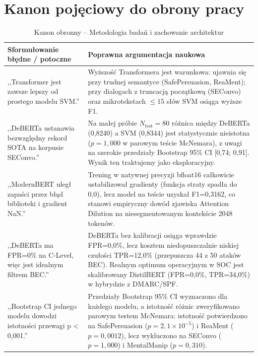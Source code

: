 \documentclass[12pt,a4paper,twoside]{report}
\begin{document}
\chapter{Kanon pojęciowy do obrony pracy}\label{app:banned}
\begin{table}[H]\centering
\caption{Kanon obronny -- Metodologia badań i zachowanie architektur}\label{tab:banned_arch}
\footnotesize
\begin{tabularx}{\textwidth}{X X}\toprule
\textbf{Sformułowanie błędne / potoczne} & \textbf{Poprawna argumentacja naukowa} \\\midrule
,,Transformer jest zawsze lepszy od prostego modelu SVM.'' &
  Wyższość Transformera jest warunkowa: ujawnia się przy trudnej semantyce (SafePersuasion, ReaMent); przy dialogach z truncacją początkową (SEConvo) oraz mikrotekstach $\le 15$ słów SVM osiąga wyższe F1. \\\midrule
,,DeBERTa ustanawia bezwzględny rekord SOTA na korpusie SEConvo.'' &
  Na małej próbie $N_{\text{test}}=80$ różnica między DeBERTa (0,8240) a SVM (0,8344) jest statystycznie nieistotna ($p = 1,000$ w parowym teście McNemara), z uwagi na szerokie przedziały Bootstrap 95\% CI [0,74; 0,91]. Wynik ten traktujemy jako eksploracyjny. \\\midrule
,,ModernBERT uległ zapaści przez błąd biblioteki i gradient NaN.'' &
  Trening w natywnej precyzji bfloat16 całkowicie ustabilizował gradienty (funkcja straty spadła do 0,0), lecz model na teście uzyskał F1=0,3162, co stanowi empiryczny dowód zjawiska Attention Dilution na niesegmentowanym kontekście 2048 tokenów. \\\midrule
,,DeBERTa ma FPR=0\% na C-Level, więc jest idealnym filtrem BEC.'' &
  DeBERTa bez kalibracji osiąga wprawdzie FPR=0,0\%, lecz kosztem niedopuszczalnie niskiej czułości TPR=12,0\% (przepuszcza 44 z 50 ataków BEC). Realnym optimum operacyjnym w SOC jest skalibrowany DistilBERT (FPR=0,0\%, TPR=34,0\%) w hybrydzie z DMARC/SPF. \\\midrule
,,Bootstrap CI jednego modelu dowodzi istotności przewagi p < 0,001.'' &
  Przedziały Bootstrap 95\% CI wyznaczono dla każdego modelu, a istotność różnic zweryfikowano parowym testem McNemara: istotność potwierdzono na SafePersuasion ($p=2,1 \times 10^{-5}$) i ReaMent ($p=0,0012$), lecz wykluczono na SEConvo ($p=1,000$) i MentalManip ($p=0,310$). \\
\bottomrule\end{tabularx}
\end{table}
\end{document}
